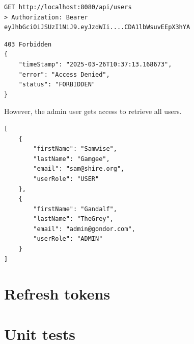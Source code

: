 \begin{verbatim}
GET http://localhost:8080/api/users
> Authorization: Bearer eyJhbGciOiJSUzI1NiJ9.eyJzdWIi....CDA1lbWsuvEEpX3hYA
\end{verbatim}

\begin{verbatim}
403 Forbidden
{
	"timeStamp": "2025-03-26T10:37:13.168673",
	"error": "Access Denied",
	"status": "FORBIDDEN"
}
\end{verbatim}

However,  the admin user gets access to retrieve all users.

\begin{verbatim}
[
	{
		"firstName": "Samwise",
		"lastName": "Gamgee",
		"email": "sam@shire.org",
		"userRole": "USER"
	},
	{
		"firstName": "Gandalf",
		"lastName": "TheGrey",
		"email": "admin@gondor.com",
		"userRole": "ADMIN"
	}
]
\end{verbatim}




\section{Refresh tokens}




\section{Unit tests}


